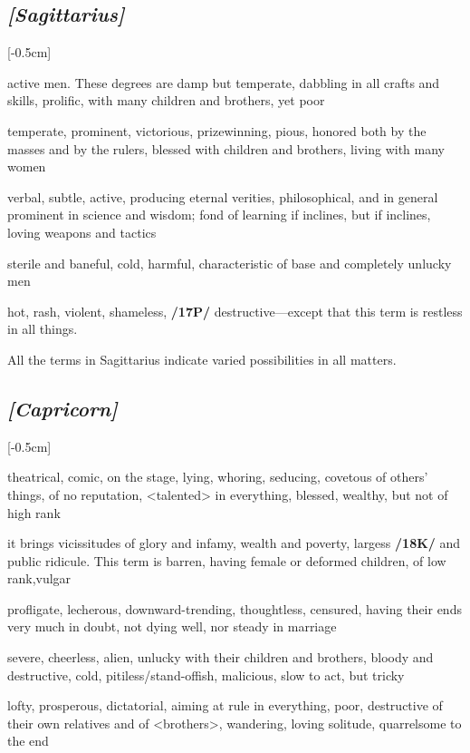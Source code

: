 \subsection{\textit{[Sagittarius]}}
\marginnote{\Sagittarius}[-0.5cm]
\vspace{-1mm}
\begin{description}[labelindent=0em , labelwidth=1em, labelsep=1em, leftmargin =!]
\item[\Jupiter]
	[0-11] active men. These degrees are damp but temperate,
dabbling in all crafts and skills, prolific, with many children and brothers, yet poor
\item[\Venus]
	[12-16] temperate, prominent, victorious, prizewinning, pious, honored both by the masses and by the rulers, blessed with children and brothers, living with many women
\item[\Mercury]
	[17-20] verbal, subtle, active, producing eternal verities, philosophical, and in general prominent in science and wisdom; fond of learning if \Mercury\xspace inclines, but if \Mars\xspace inclines, loving weapons and tactics	
\item[\Saturn]
	[21-25] sterile and baneful, cold, harmful, characteristic of base and completely unlucky men	
\item[\Mars]
	[26-29] hot, rash, violent, shameless, \textbf{/17P/} destructive—except that this term is restless in all things. 
\end{description}

\mndl[0.2cm]
All the terms in Sagittarius indicate varied possibilities in all matters.

\subsection{\textit{[Capricorn]}}
\marginnote{\Capricorn}[-0.5cm]
\vspace{-1mm}
\begin{description}[labelindent=0em , labelwidth=1em, labelsep=1em, leftmargin =!]
\item[\Mercury]
	[0-6] theatrical, comic, on the stage, lying, whoring,
seducing, covetous of others’ things, of no reputation, <talented> in everything, blessed, wealthy, but not of high rank
\item[\Jupiter]
	[7-13] it brings vicissitudes of glory and infamy, wealth and poverty,
largess \textbf{/18K/} and public ridicule. This term is barren, having female or deformed children, of low rank,vulgar
\item[\Venus]
	[14-21] profligate, lecherous, downward-trending, thoughtless, censured, having their ends very much in doubt, not dying well, nor steady in marriage
\item[\Saturn]
	[22-25] severe, cheerless, alien, unlucky with their children and brothers, bloody and destructive, cold, pitiless/stand-offish, malicious, slow to act, but tricky	
\item[\Mars]
	[26-29] lofty, prosperous, dictatorial, aiming at rule in everything, poor, destructive of their own relatives and of
<brothers>, wandering, loving solitude, quarrelsome to the end
\end{description}

